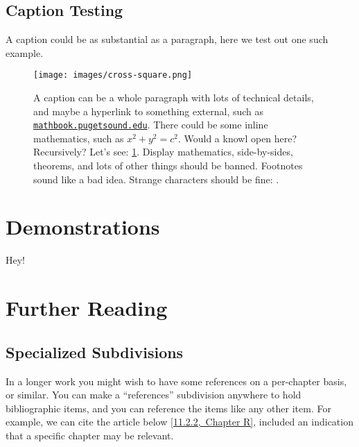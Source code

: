 \documentclass[10pt,]{article}
\theoremstyle{plain}
\theoremstyle{definition}
\theoremstyle{definition}
\theoremstyle{definition}
\theoremstyle{definition}
\theoremstyle{definition}
\theoremstyle{definition}
\numberwithin{equation}{section}
\begin{document}
\subsection[{Caption Testing}]{Caption Testing}\label{subsection-26}
\hypertarget{p-274}{}%
A caption could be as substantial as a paragraph, here we test out one such example.%
\begin{figure}
\centering
\texttt{[image: images/cross-square.png]}
\caption{A caption can be a whole paragraph with lots of technical details, and maybe a hyperlink to something external, such as \href{http://mathbook.pugetsound.edu}{\lstinline?mathbook.pugetsound.edu?}.  There could be some inline mathematics, such as \(x^2 + y^2 = c^2\).  Would a knowl open here?  Recursively?  Let's see: \hyperref[figure-long-caption]{\ref{figure-long-caption}}.  Display mathematics, side-by-sides, theorems, and lots of other things should be banned.  Footnotes sound like a bad idea.  Strange characters should be fine: \textsection{}.\label{figure-long-caption}}
\end{figure}
\typeout{************************************************}
\typeout{************************************************}
\section[{Demonstrations}]{Demonstrations}\label{section-10}
 \hypertarget{p-275}{}%
Hey!%
 \typeout{************************************************}
\typeout{************************************************}
\section[{Further Reading}]{Further Reading}\label{section-11}
\typeout{************************************************}
\typeout{************************************************}
\subsection[{Specialized Subdivisions}]{Specialized Subdivisions}\label{subsection-27}
\hypertarget{p-276}{}%
In a longer work you might wish to have some references on a per-chapter basis, or similar.  You can make a ``references'' subdivision anywhere to hold bibliographic items, and you can reference the items like any other item.  For example, we can cite the article below \hyperlink{biblio-beezer-fcla}{[11.2.2,~Chapter R]}, included an indication that a specific chapter may be relevant.%
\typeout{************************************************}
\typeout{************************************************}
\end{document}
